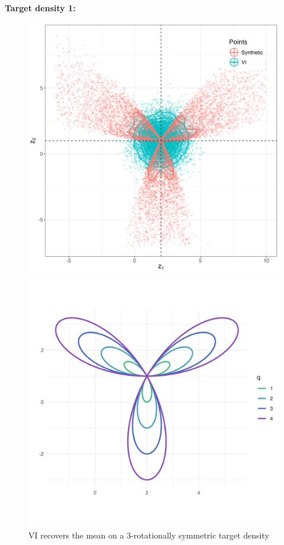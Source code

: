 \documentclass{article}
\begin{document}
\clearpage
\textbf{Target density 1:}
\begin{figure}[h!]
    \centering
    \begin{minipage}{0.6\textwidth}
        \centering
        \includegraphics[width=\linewidth]{plots/VI_ex1.png}
        \caption{VI recovers the mean on a 3-rotationally symmetric target density}
    \end{minipage}
    \hfill
    \begin{minipage}{0.45\textwidth}
        \centering
        \includegraphics[width=\linewidth]{plots/level_curves_ex1.png}

\end{minipage}
\end{figure}
\end{document}

